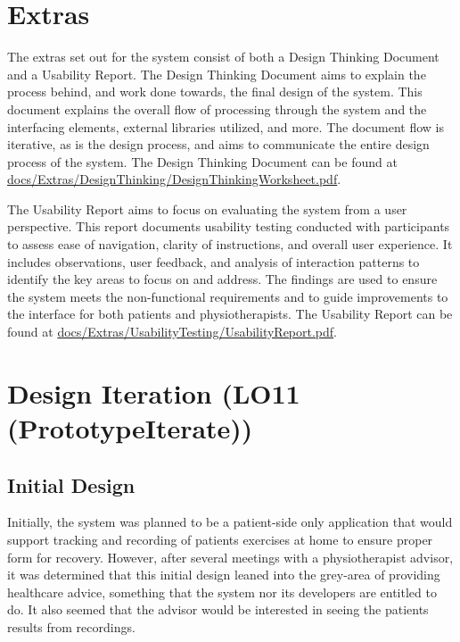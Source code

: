 \documentclass{article}
\begin{document}
\section{Extras}

The extras set out for the system consist of both a Design Thinking Document and a Usability Report. 
The Design Thinking Document aims to explain the process behind, and work done towards, 
the final design of the system. This document explains the overall flow of processing through the 
system and the interfacing elements, external libraries utilized, and more. The document flow is 
iterative, as is the design process, and aims to communicate the entire design process of the 
system. The Design Thinking Document can be found at \href{https://github.com/M9Huynh/technically-functional/blob/main/docs/Extras/DesignThinking/DesignThinkingWorksheet.pdf}{docs/Extras/DesignThinking/DesignThinkingWorksheet.pdf}.

The Usability Report aims to focus on evaluating the system from a user perspective. 
This report documents usability testing conducted with participants to assess ease of navigation, 
clarity of instructions, and overall user experience. It includes observations, user feedback, and 
analysis of interaction patterns to identify the key areas to focus on and address. The findings are 
used to ensure the system meets the non-functional requirements and to guide improvements
to the interface for both patients and physiotherapists. The Usability Report can be found at
\href{https://github.com/M9Huynh/technically-functional/blob/main/docs/Extras/UsabilityTesting/UsabilityReport.pdf}{docs/Extras/UsabilityTesting/UsabilityReport.pdf}.

\section{Design Iteration (LO11 (PrototypeIterate))}

\subsection{Initial Design}

Initially, the system was planned to be a patient-side only application that would support tracking and recording of patients exercises at home to ensure proper form for recovery. However, after several meetings with a physiotherapist advisor, it was determined that this initial design leaned into the grey-area of providing healthcare advice, something that the system nor its developers are entitled to do. It also seemed that the advisor would be interested in seeing the patients results from recordings.
\end{document}
